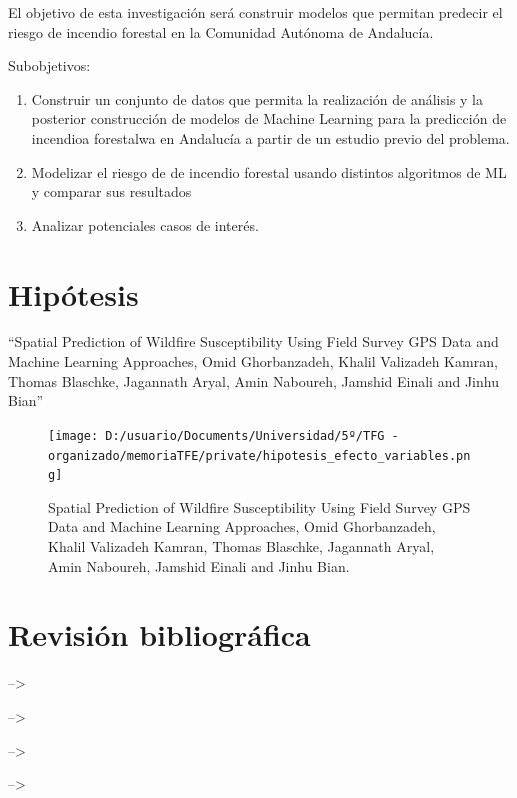 \documentclass[12pt,a4paper,]{book}
\numberwithin{dummy}{section}
\theoremstyle{ocrenumbox}
\theoremstyle{blacknumex}
\theoremstyle{blacknumbox}
\theoremstyle{ocrenum}
\theoremstyle{ocrenum}
\begin{document}
El objetivo de esta investigación será construir modelos que permitan
predecir el riesgo de incendio forestal en la Comunidad Autónoma de
Andalucía.

Subobjetivos:

\begin{enumerate}
\def\labelenumi{\arabic{enumi}.}
\item
  Construir un conjunto de datos que permita la realización de análisis
  y la posterior construcción de modelos de Machine Learning para la
  predicción de incendioa forestalwa en Andalucía a partir de un estudio
  previo del problema.
\item
  Modelizar el riesgo de de incendio forestal usando distintos
  algoritmos de ML y comparar sus resultados
\item
  Analizar potenciales casos de interés.
\end{enumerate}

\hypertarget{hipuxf3tesis}{%
\section{Hipótesis}\label{hipuxf3tesis}}

``Spatial Prediction of Wildfire Susceptibility Using Field Survey GPS
Data and Machine Learning Approaches, Omid Ghorbanzadeh, Khalil
Valizadeh Kamran, Thomas Blaschke, Jagannath Aryal, Amin Naboureh,
Jamshid Einali and Jinhu Bian''

\begin{figure}
\centering
\texttt{[image: D:/usuario/Documents/Universidad/5º/TFG - organizado/memoriaTFE/private/hipotesis\_efecto\_variables.png]}
\caption{Spatial Prediction of Wildfire Susceptibility Using Field
Survey GPS Data and Machine Learning Approaches, Omid Ghorbanzadeh,
Khalil Valizadeh Kamran, Thomas Blaschke, Jagannath Aryal, Amin
Naboureh, Jamshid Einali and Jinhu Bian.}
\end{figure}

\hypertarget{revisiuxf3n-bibliogruxe1fica}{%
\section{Revisión bibliográfica}\label{revisiuxf3n-bibliogruxe1fica}}

--\textgreater{}

--\textgreater{}

--\textgreater{}

--\textgreater{}

\FloatBarrier
\end{document}
